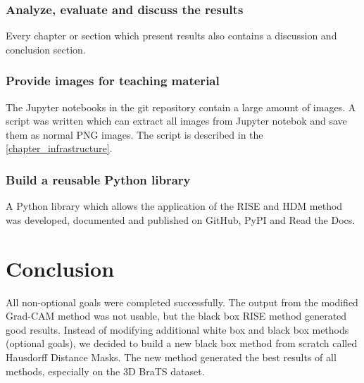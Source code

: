 \subsubsection{Analyze, evaluate and discuss the results}
Every chapter or section which present results also contains a discussion and conclusion section.

\subsubsection{Provide images for teaching material}
The Jupyter notebooks in the git repository contain a large amount of images. A script was written which can extract all images from Jupyter notebok and save them as normal PNG images. The script is described in the \autoref{chapter_infrastructure}.

\subsubsection{Build a reusable Python library}
A Python library which allows the application of the RISE and HDM method was developed, documented and published on GitHub, PyPI and Read the Docs.

\section{Conclusion}
All non-optional goals were completed successfully. The output from the modified Grad-CAM method was not usable, but the black box RISE method generated good results. Instead of modifying additional white box and black box methods (optional goals), we decided to build a new black box method from scratch called Hausdorff Distance Masks. The new method generated the best results of all methods, especially on the 3D BraTS dataset.

